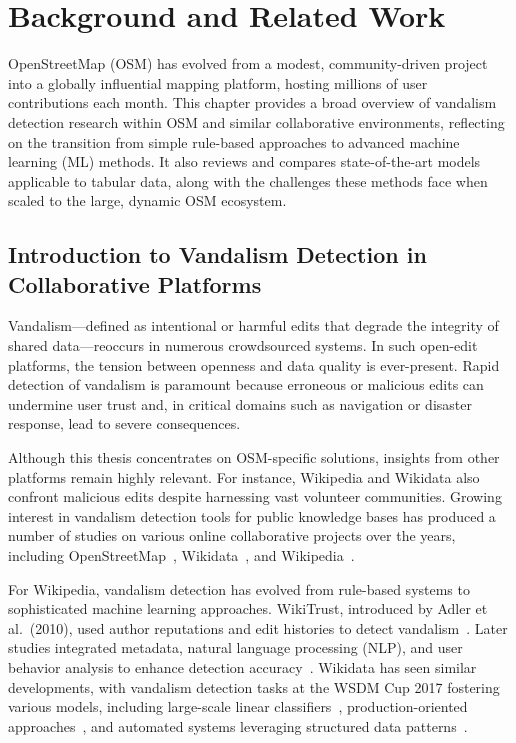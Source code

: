 \documentclass[
    13pt, %
    a4paper, %
    listof=totoc, %
    bibliography=totoc, %
    index=totoc, %
    headsepline
]{scrreprt}
\begin{document}

\chapter{Background and Related Work}\label{background}

OpenStreetMap (OSM) has evolved from a modest, community-driven project into a globally influential mapping platform, hosting millions of user contributions each month. This chapter provides a broad overview of vandalism detection research within OSM and similar collaborative environments, reflecting on the transition from simple rule-based approaches to advanced machine learning (ML) methods. It also reviews and compares state-of-the-art models applicable to tabular data, along with the challenges these methods face when scaled to the large, dynamic OSM ecosystem.

\section{Introduction to Vandalism Detection in Collaborative Platforms}
\label{sec:intro_vandalism_collab}

Vandalism—defined as intentional or harmful edits that degrade the integrity of shared data—reoccurs in numerous crowdsourced systems. In such open-edit platforms, the tension between openness and data quality is ever-present. Rapid detection of vandalism is paramount because erroneous or malicious edits can undermine user trust and, in critical domains such as navigation or disaster response, lead to severe consequences. 

Although this thesis concentrates on OSM-specific solutions, insights from other platforms remain highly relevant. For instance, Wikipedia and Wikidata also confront malicious edits despite harnessing vast volunteer communities. Growing interest in vandalism detection tools for public knowledge bases has produced a number of studies on various online collaborative projects over the years, including OpenStreetMap~\cite{OSMPatrol, Truong2018, Truong2020}, Wikidata~\cite{Heindorf2016, Crescenzi2017, Grigorev2017, Heindorf2017, Sarabadani2017}, and Wikipedia~\cite{Adler2010, Adler2011, Itakura2009, Kumar2015, McKeown2010, Smets2008, Tran2014, Yuan2017}.

For Wikipedia, vandalism detection has evolved from rule-based systems to sophisticated machine learning approaches. WikiTrust, introduced by Adler et al.\ (2010), used author reputations and edit histories to detect vandalism~\cite{Adler2010}. Later studies integrated metadata, natural language processing (NLP), and user behavior analysis to enhance detection accuracy~\cite{Adler2011, Itakura2009, Kumar2015, Smets2008}. Wikidata has seen similar developments, with vandalism detection tasks at the WSDM Cup 2017 fostering various models, including large-scale linear classifiers~\cite{Grigorev2017}, production-oriented approaches~\cite{Crescenzi2017}, and automated systems leveraging structured data patterns~\cite{Heindorf2017, Sarabadani2017}.
\end{document}
